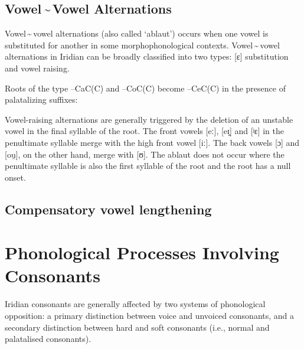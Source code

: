 \subsection{Vowel\,\sim\,Vowel Alternations}
Vowel\,\sim\,vowel alternations (also called `ablaut') occurs when one vowel is substituted for another in some morphophonological contexts. Vowel\,\sim\,vowel alternations in Iridian can be broadly classified into two types: [ɛ] substitution and vowel raising.

Roots of the type --CaC(C) and --CoC(C) become --CeC(C) in the presence of palatalizing suffixes:

\ex
{}
\xe

Vowel-raising alternations are generally triggered by the deletion of an unstable vowel in the final syllable of the root. The front vowels [eː], [eɪ̯] and [ʲɛ] in the penultimate syllable merge with the high front vowel [iː]. The back vowels [ɔ] and [ou̯], on the other hand, merge with [ʊ]. The ablaut does not occur where the penultimate syllable is also the first syllable of the root and the root has a null onset.

\ex
{}
\xe


\subsection{Compensatory vowel lengthening}



\section{Phonological Processes Involving Consonants}


Iridian consonants are generally affected by two systems of phonological opposition: a primary distinction between voice and unvoiced consonants, and a secondary distinction between hard and soft consonants (i.e., normal and palatalised consonants).


